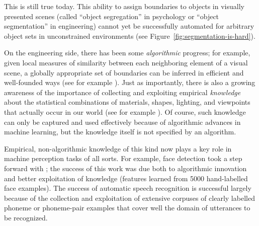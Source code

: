 \noindent
This is still true today.  This ability 
to assign
boundaries to objects in visually presented scenes 
(called ``object segregation''
in psychology or ``object segmentation'' in engineering) cannot yet be
successfully automated for arbitrary object sets in unconstrained
environments (see Figure~\ref{fig:segmentation-is-hard}).

On the engineering side, there has been some {\em algorithmic} progress; for
example, given local measures of similarity between each neighboring
element of a visual scene, a globally appropriate set of boundaries
can be inferred in efficient and well-founded ways (see for example
).
%
%
Just as importantly, there is also a growing awareness of the
importance of collecting and exploiting empirical {\em knowledge}
about the statistical combinations of materials, shapes, lighting, and
viewpoints that actually occur in our world (see for example
).  Of course, such knowledge can only be
captured and used effectively because of algorithmic advances in
machine learning, but the knowledge itself is not specified by an
algorithm.

Empirical, non-algorithmic knowledge of this kind now plays a key role
in machine perception tasks of all sorts.
%
For example, face detection took a step forward with
; the success of this work was due both to
algorithmic innovation and better exploitation of knowledge (features
learned from 5000 hand-labelled face examples).
%
The success of automatic speech recognition is successful largely
because of the collection and exploitation of extensive corpuses of
clearly labelled phoneme or phoneme-pair examples that cover well the
domain of utterances to be recognized.
%

